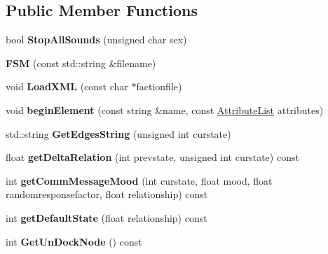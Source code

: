 \subsection*{Public Member Functions}
\begin{DoxyCompactItemize}
\item 
bool {\bfseries Stop\+All\+Sounds} (unsigned char sex)\hypertarget{classFSM_a0f74c42b778d479e60cd20f6e1091d87}{}\label{classFSM_a0f74c42b778d479e60cd20f6e1091d87}

\item 
{\bfseries F\+SM} (const std\+::string \&filename)\hypertarget{classFSM_afdea01bdf64def509ac34f004298af14}{}\label{classFSM_afdea01bdf64def509ac34f004298af14}

\item 
void {\bfseries Load\+X\+ML} (const char $\ast$factionfile)\hypertarget{classFSM_a8aae87a68d2e37808f5bf2dad882885e}{}\label{classFSM_a8aae87a68d2e37808f5bf2dad882885e}

\item 
void {\bfseries begin\+Element} (const string \&name, const \hyperlink{classXMLSupport_1_1AttributeList}{Attribute\+List} attributes)\hypertarget{classFSM_a3f5336fe3273dfd270e9963a10e082cf}{}\label{classFSM_a3f5336fe3273dfd270e9963a10e082cf}

\item 
std\+::string {\bfseries Get\+Edges\+String} (unsigned int curstate)\hypertarget{classFSM_a1361b0ff3ed433629eea598c73ee0d05}{}\label{classFSM_a1361b0ff3ed433629eea598c73ee0d05}

\item 
float {\bfseries get\+Delta\+Relation} (int prevstate, unsigned int curstate) const \hypertarget{classFSM_a2cb1e52d17cd6cdb3b287b76bcaf1ae7}{}\label{classFSM_a2cb1e52d17cd6cdb3b287b76bcaf1ae7}

\item 
int {\bfseries get\+Comm\+Message\+Mood} (int curstate, float mood, float randomresponsefactor, float relationship) const \hypertarget{classFSM_a2545d8c581a19bf567404a4a4bd68e31}{}\label{classFSM_a2545d8c581a19bf567404a4a4bd68e31}

\item 
int {\bfseries get\+Default\+State} (float relationship) const \hypertarget{classFSM_a4c615f9aad4634a9a2dc15ae37e9c177}{}\label{classFSM_a4c615f9aad4634a9a2dc15ae37e9c177}

\item 
int {\bfseries Get\+Un\+Dock\+Node} () const \hypertarget{classFSM_a2d1c6ae118d02cf557f75b6044f64ad1}{}\label{classFSM_a2d1c6ae118d02cf557f75b6044f64ad1}


\end{DoxyCompactItemize}
